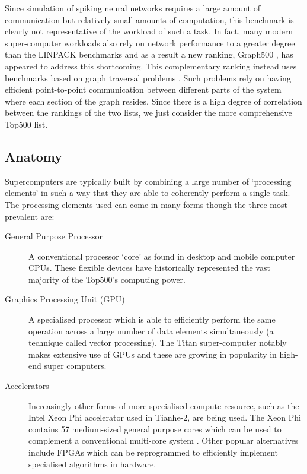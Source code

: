 		Since simulation of spiking neural networks requires a large amount of
		communication but relatively small amounts of computation, this benchmark is
		clearly not representative of the workload of such a task.  In fact, many
		modern super-computer workloads also rely on network performance to a
		greater degree than the LINPACK benchmarks and as a result a new ranking,
		Graph500 \cite{murphy13n}, has appeared to address this shortcoming. This
		complementary ranking instead uses benchmarks based on graph traversal
		problems \cite{murphy10}. Such problems rely on having efficient
		point-to-point communication between different parts of the system where
		each section of the graph resides. Since there is a high degree of
		correlation between the rankings of the two lists, we just consider the more
		comprehensive Top500 list.
		
		
		\subsection{Anatomy}
			
			
			Supercomputers are typically built by combining a large number of
			`processing elements' in such a way that they are able to coherently
			perform a single task. The processing elements used can come in many forms
			though the three most prevalent are:
			
			\begin{description}
				
				\item[General Purpose Processor] A conventional processor `core' as
				found in desktop and mobile computer CPUs. These flexible devices have
				historically represented the vast majority of the Top500's computing
				power.
				
				\item[Graphics Processing Unit (GPU)] A specialised processor which is
				able to efficiently perform the same operation across a large number of
				data elements simultaneously (a technique called vector processing). The
				Titan super-computer notably makes extensive use of GPUs \cite{bland12}
				and these are growing in popularity in high-end super computers.
				
				\item[Accelerators] Increasingly other forms of more specialised compute
				resource, such as the Intel Xeon Phi accelerator used in Tianhe-2, are
				being used. The Xeon Phi contains 57 medium-sized general purpose cores
				which can be used to complement a conventional multi-core system
				\cite{dongarra13}. Other popular alternatives include FPGAs which can be
				reprogrammed to efficiently implement specialised algorithms in
				hardware.
				
			\end{description}
			

